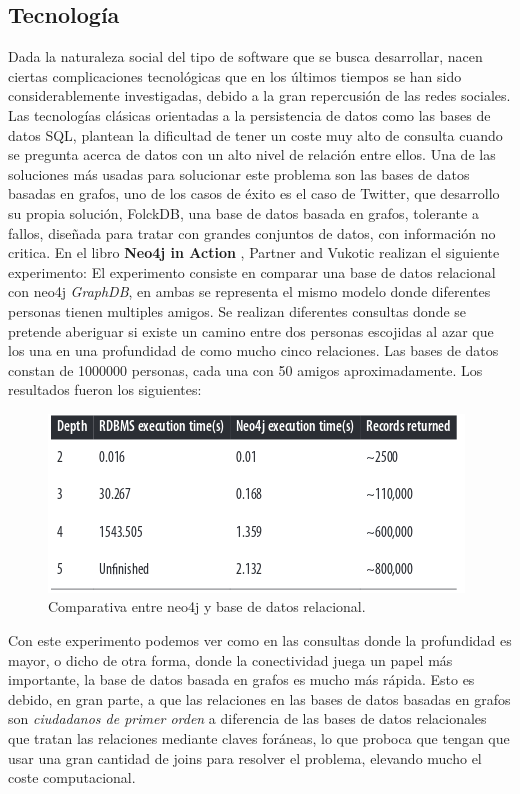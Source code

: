 \documentclass[12pt]{article} %
\begin{document}
\subsection{Tecnología}
Dada la naturaleza social del tipo de software que se busca desarrollar, nacen ciertas complicaciones tecnológicas que en los últimos tiempos se han sido considerablemente investigadas, debido a la gran repercusión de las redes sociales. Las tecnologías clásicas orientadas a la persistencia de datos como las bases de datos SQL, plantean la dificultad de tener un coste muy alto de consulta cuando se pregunta acerca de datos  con un alto nivel de relación entre ellos. Una de las soluciones más usadas para solucionar este problema son las bases de datos basadas en grafos, uno de los casos de éxito es el caso de Twitter, que desarrollo su propia solución, FolckDB, una base de datos basada en grafos, tolerante a fallos, diseñada para tratar con grandes conjuntos de datos, con información no critica.\newline
En el libro \textbf{Neo4j in Action} \cite{neo4jinaction}, Partner and Vukotic realizan el siguiente experimento: \newline
El experimento consiste en comparar una base de datos relacional con neo4j \textit{GraphDB}, en ambas se representa el mismo modelo donde diferentes personas tienen multiples amigos. Se realizan diferentes consultas donde se pretende aberiguar si existe un camino entre dos personas escojidas al azar que los una en una profundidad de como mucho cinco relaciones. Las bases de datos constan de 1000000 personas, cada una con 50 amigos aproximadamente. Los resultados fueron los siguientes:

\begin{figure}[ht!]
\center
\includegraphics[scale=0.5]{table_find_friends_experiment.png}
\caption{Comparativa entre neo4j y base de datos relacional.}
\label{fig:compa}
\end{figure}

Con este experimento podemos ver como en las consultas donde la profundidad es mayor, o dicho de otra forma, donde la conectividad juega un papel más importante, la base de datos basada en grafos es mucho más rápida. Esto es debido, en gran parte, a que las relaciones en las bases de datos basadas en grafos son \textit{ciudadanos de primer orden} a diferencia de las bases de datos relacionales que tratan las relaciones mediante claves foráneas, lo que proboca que tengan que usar una gran cantidad de joins para resolver el problema, elevando mucho el coste computacional.
\end{document}

